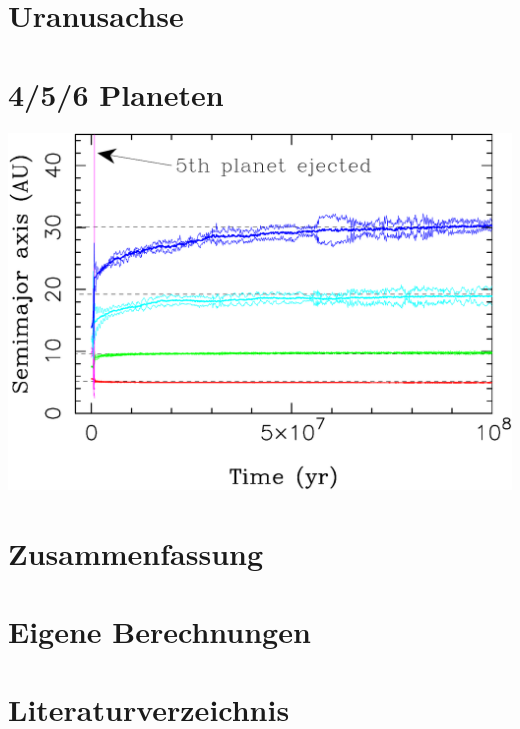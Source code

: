 \documentclass[10pt,a4paper,twoside]{article}
\renewenvironment{figure}{}{}
\begin{document}
\section{Uranusachse}\label{Uranusachse}

\section{4/5/6 Planeten}\label{mehrPlaneten}
\begin{figure}[tbn]
\includegraphics[scale=0.5]{img/Nesvorny2011-1.pdf}
\caption{XXX}
\end{figure}

\section{Zusammenfassung}


\newpage
\renewcommand{\thesection}{\Alph{section}}
\setcounter{section}{0} %
\section{Eigene Berechnungen}
\section{Literaturverzeichnis}

{}

\end{document}
